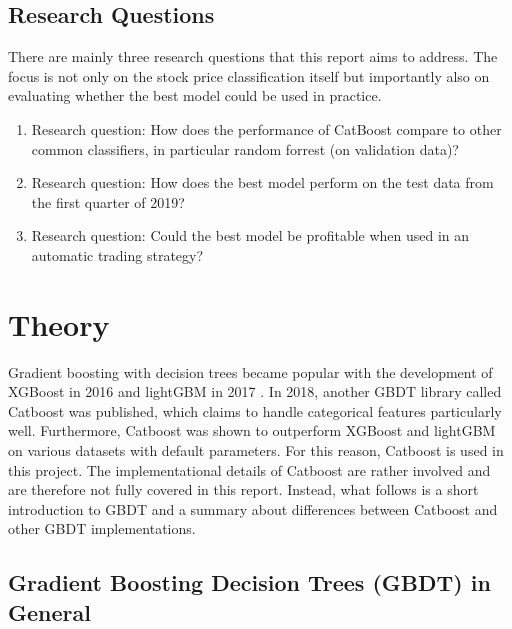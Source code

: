 \documentclass{article}
\begin{document}


	\subsection{Research Questions}
	
	There are mainly three research questions that this report aims to address. The focus is not only on the stock price classification itself but importantly also on evaluating whether the best model could be used in practice.
	
	\begin{enumerate}
		\item Research question: How does the performance of CatBoost compare to other common classifiers, in particular random forrest (on validation data)?
		\item Research question: How does the best model perform on the test data from the first quarter of 2019?
		\item Research question: Could the best model be profitable when used in an automatic trading strategy?
	
	\end{enumerate}

	\section{Theory}
	
	Gradient boosting with decision trees became popular with the development of XGBoost in 2016 \cite{chen_xgboost:_2016} and lightGBM in 2017 \cite{ke_lightgbm:_2017}. In 2018, another GBDT library called Catboost was published, which claims to handle categorical features particularly well. Furthermore, Catboost was shown to outperform XGBoost and lightGBM on various datasets with default parameters. For this reason, Catboost is used in this project. The implementational details of Catboost are rather involved and are therefore not fully covered in this report. Instead, what follows is a short introduction to GBDT and a summary about differences between Catboost and other GBDT implementations.

	\subsection{Gradient Boosting Decision Trees (GBDT) in General}
	
\end{document}

